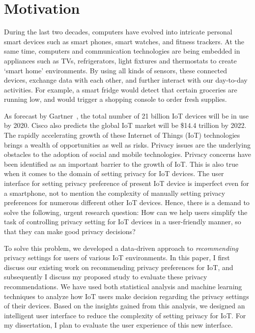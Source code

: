 \chapter{Motivation}\label{motivation}\label{chapter:Motivation}

During the last two decades, computers have evolved into intricate personal smart devices such as smart phones, smart watches, and fitness trackers. At the same time, computers and communication technologies are being embedded in appliances such as TVs, refrigerators, light fixtures and thermostats to create `smart home' environments. By using all kinds of sensors, these connected devices, exchange data with each other, and further interact with our day-to-day activities. For example, a smart fridge would detect that certain groceries are running low, and would trigger a shopping console to order fresh supplies. 

As forecast by Gartner~\cite{van_der_meulen_gartner_nodate}, the total number of 21 billion IoT devices will be in use by 2020. Cisco also predicts the global IoT market will be \$14.4 trillion by 2022. The rapidly accelerating growth of these Internet of Things (IoT) technologies brings a wealth of opportunities as well as risks. Privacy issues are the underlying obstacles to the adoption of social and mobile technologies. Privacy concerns have been identified as an important barrier to the growth of IoT. %
This is also true when it comes to the domain of setting privacy for IoT devices. The user interface for setting privacy preference of present IoT device is imperfect even for a smartphone, not to mention the complexity of manually setting privacy preferences for numerous different other IoT devices. Hence, there is a demand to solve the following, urgent research question: How can we help users simplify the task of controlling privacy setting for IoT devices in a user-friendly manner, so that they can make good privacy decisions?

To solve this problem, we developed a data-driven approach to \emph{recommending} privacy settings for users of various IoT environments. In this paper, I first discuss our existing work on recommending privacy preferences for IoT, and subsequently I discuss my proposed study to evaluate these privacy recommendations. 
We have used both statistical analysis and machine learning techniques to analyze how IoT users make decision regarding the privacy settings of their devices. Based on the insights gained from this analysis, we designed an intelligent user interface to reduce the complexity of setting privacy for IoT. For my dissertation, I plan to evaluate the user experience of this new interface.

